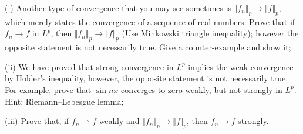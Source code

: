 \documentclass[6pt]{article}
\numberwithin{equation}{section}
\begin{document}
\begin{enumerate}
(i)  Another type of convergence that you may see sometimes is $\Vert f_n \Vert_p\rightarrow \Vert f\Vert_p$, which merely states the convergence of a sequence of real numbers.  Prove that if $f_n \rightarrow f$ in $L^p$, then $\Vert f_n \Vert_p\rightarrow \Vert f\Vert_p$ (Use Minkowski triangle inequality); however the opposite statement is not necessarily true.  Give a counter-example and show it;

(ii) We have proved that strong convergence in $L^p$ implies the weak convergence by Holder's inequality, however, the opposite statement is not necessarily true.  For example, prove that $\sin nx$ converges to zero weakly, but not strongly in $L^p$.  Hint: Riemann--Lebesgue lemma;

(iii) Prove that, if $f_n \rightharpoonup f$ weakly and $\Vert f_n \Vert_p\rightarrow \Vert f\Vert_p$, then $f_n\rightarrow f$ strongly.
\end{enumerate}
\end{document}
